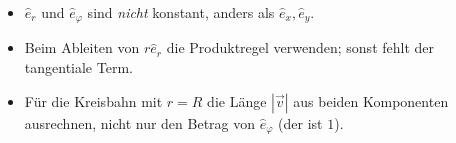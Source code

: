 \begin{achtung}
\begin{itemize}
  \item $\hat e_r$ und $\hat e_\varphi$ sind \emph{nicht} konstant, anders
        als $\hat e_x,\hat e_y$.
  \item Beim Ableiten von $r\hat e_r$ die Produktregel verwenden; sonst
        fehlt der tangentiale Term.
  \item Für die Kreisbahn mit $r=R$ die Länge $|\vec v|$ aus beiden
        Komponenten ausrechnen, nicht nur den Betrag von $\hat e_\varphi$
        (der ist $1$).
\end{itemize}
\end{achtung}
